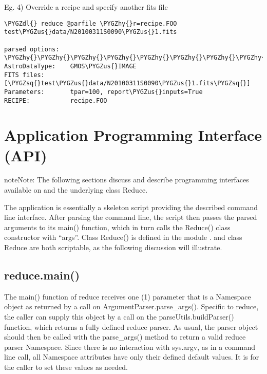 \documentclass[letterpaper,10pt,english]{sphinxmanual}
\def\PYGZus{\char`\_}
\def\PYGZdl{\char`\$}
\def\PYGZhy{\char`\-}
\def\PYGZsq{\char`\'}
\begin{document}
Eg. 4) Override a recipe and specify another fits file

\begin{Verbatim}[commandchars=\\\{\}]
\PYGZdl{} reduce @parfile \PYGZhy{}r=recipe.FOO test\PYGZus{}data/N20100311S0090\PYGZus{}1.fits

parsed options:
\PYGZhy{}\PYGZhy{}\PYGZhy{}\PYGZhy{}\PYGZhy{}\PYGZhy{}\PYGZhy{}\PYGZhy{}\PYGZhy{}\PYGZhy{}\PYGZhy{}\PYGZhy{}\PYGZhy{}\PYGZhy{}\PYGZhy{}\PYGZhy{}\PYGZhy{}\PYGZhy{}\PYGZhy{}\PYGZhy{}
AstroDataType:    GMOS\PYGZus{}IMAGE
FITS files:       [\PYGZsq{}test\PYGZus{}data/N20100311S0090\PYGZus{}1.fits\PYGZsq{}]
Parameters:       tpar=100, report\PYGZus{}inputs=True
RECIPE:           recipe.FOO
\end{Verbatim}


\section{Application Programming Interface (API)}
\label{interfaces:application-programming-interface-api}
\begin{notice}{note}{Note:}
The following sections discuss and describe programming interfaces
available on  and the underlying class Reduce.
\end{notice}

The  application is essentially a skeleton script providing the
described command line interface. After parsing the command line, the script
then passes the parsed arguments to its main() function, which in turn calls
the Reduce() class constructor with ``args''. Class Reduce() is defined
in the module .  and class Reduce are both
scriptable, as the following discussion will illustrate.


\subsection{reduce.main()}
\label{interfaces:main}\label{interfaces:reduce-main}
The main() function of reduce receives one (1) parameter that is a Namespace
object as returned by a call on ArgumentParser.parse\_args(). Specific to reduce,
the caller can supply this object by a call on the parseUtils.buildParser()
function, which returns a fully defined reduce parser. As usual, the parser
object should then be called with the parse\_args() method to return a valid
reduce parser Namespace. Since there is no interaction with sys.argv, as in
a command line call, all Namespace attributes have only their defined default
values. It is for the caller to set these values as needed.
\end{document}
